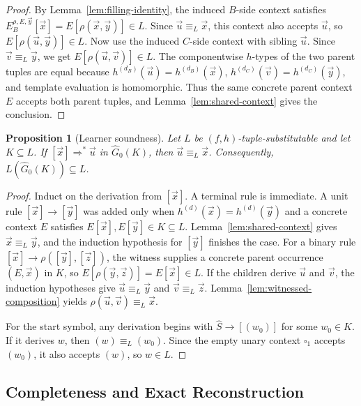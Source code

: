 \documentclass[11pt,a4paper]{article}
\newtheorem{proposition}[theorem]{Proposition}
\theoremstyle{remark}
\newcommand{\tuple}[1]{\vec{#1}}
\newcommand{\blank}{\square}
\begin{document}
\begin{proof}
By Lemma~\ref{lem:filling-identity}, the induced \(B\)-side context satisfies
\(E_B^{\rho,E,\tuple y}[\tuple x]=E[\rho(\tuple x,\tuple y)]\in L\).  Since
\(\tuple u\equiv_L\tuple x\), this context also accepts \(\tuple u\), so
\(E[\rho(\tuple u,\tuple y)]\in L\).  Now use the induced \(C\)-side context
with sibling \(\tuple u\).  Since \(\tuple v\equiv_L\tuple y\), we get
\(E[\rho(\tuple u,\tuple v)]\in L\).  The componentwise \(h\)-types of the two
parent tuples are equal because \(h^{(d_B)}(\tuple u)=h^{(d_B)}(\tuple x)\),
\(h^{(d_C)}(\tuple v)=h^{(d_C)}(\tuple y)\), and template evaluation is
homomorphic.  Thus the same concrete parent context \(E\) accepts both parent
tuples, and Lemma~\ref{lem:shared-context} gives the conclusion.
\end{proof}

\begin{proposition}[Learner soundness]
\label{prop:learner-soundness}
Let \(L\) be \((f,h)\)-tuple-substitutable and let \(K\subseteq L\).  If
\([\tuple x]\Rightarrow^*\tuple u\) in \(\widehat G_0(K)\), then
\(\tuple u\equiv_L\tuple x\).  Consequently, \(L(\widehat G_0(K))\subseteq L\).
\end{proposition}

\begin{proof}
Induct on the derivation from \([\tuple x]\).  A terminal rule is immediate.  A
unit rule \([\tuple x]\to[\tuple y]\) was added only when \(h^{(d)}(\tuple x)=
h^{(d)}(\tuple y)\) and a concrete context \(E\) satisfies
\(E[\tuple x],E[\tuple y]\in K\subseteq L\).  Lemma~\ref{lem:shared-context}
gives \(\tuple x\equiv_L\tuple y\), and the induction hypothesis for
\([\tuple y]\) finishes the case.  For a binary rule
\([\tuple x]\to\rho([\tuple y],[\tuple z])\), the witness supplies a concrete
parent occurrence \((E,\tuple x)\) in \(K\), so \(E[\rho(\tuple y,\tuple z)]
=E[\tuple x]\in L\).  If the children derive \(\tuple u\) and \(\tuple v\), the
induction hypotheses give \(\tuple u\equiv_L\tuple y\) and
\(\tuple v\equiv_L\tuple z\).  Lemma~\ref{lem:witnessed-composition} yields
\(\rho(\tuple u,\tuple v)\equiv_L\tuple x\).

For the start symbol, any derivation begins with \(\widehat S\to[(w_0)]\) for
some \(w_0\in K\).  If it derives \(w\), then \((w)\equiv_L(w_0)\).  Since the
empty unary context \(\blank_1\) accepts \((w_0)\), it also accepts \((w)\), so
\(w\in L\).
\end{proof}

\subsection{Completeness and Exact Reconstruction}
\label{sec:completeness}
\end{document}
